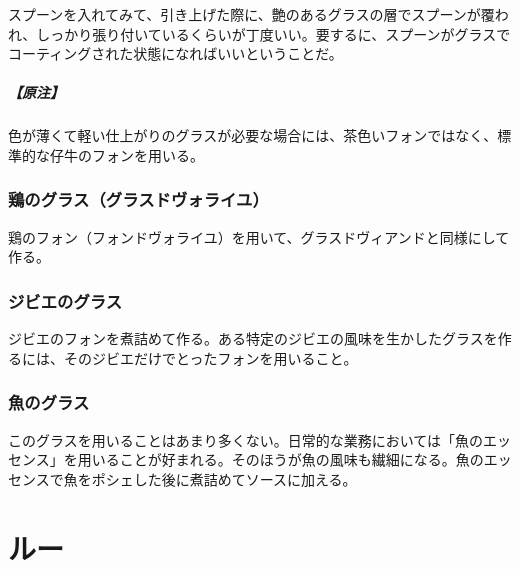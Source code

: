 \begin{recette}
スプーンを入れてみて、引き上げた際に、艶のあるグラスの層でスプーンが覆われ、しっかり張り付いているくらいが丁度いい。要するに、スプーンがグラスでコーティングされた状態になればいいということだ。

\hypertarget{nota-glace-de-viande}{%
\subparagraph{【原注】}\label{nota-glace-de-viande}}

色が薄くて軽い仕上がりのグラスが必要な場合には、茶色いフォンではなく、標準的な仔牛のフォンを用いる。

\hypertarget{glace-de-volaille}{%
\subsubsection{鶏のグラス（グラスドヴォライユ）}\label{glace-de-volaille}}



鶏のフォン（フォンドヴォライユ）を用いて、グラスドヴィアンドと同様にして作る。

\hypertarget{glace-de-gibier}{%
\subsubsection{ジビエのグラス}\label{glace-de-gibier}}



ジビエのフォンを煮詰めて作る。ある特定のジビエの風味を生かしたグラスを作るには、そのジビエだけでとったフォンを用いること。

\hypertarget{glace-de-poisson}{%
\subsubsection{魚のグラス}\label{glace-de-poisson}}



このグラスを用いることはあまり多くない。日常的な業務においては「魚のエッセンス」を用いることが好まれる。そのほうが魚の風味も繊細になる。魚のエッセンスで魚をポシェした後に煮詰めてソースに加える。
\end{recette}
\hypertarget{roux}{%
\section{ルー}\label{roux}}

